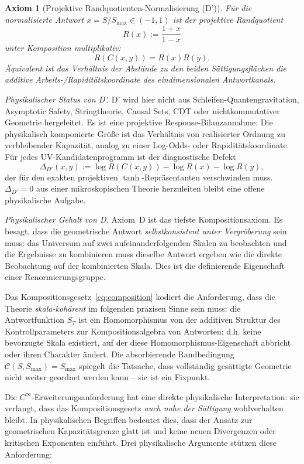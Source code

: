 \documentclass[aps,prd,twocolumn,superscriptaddress,nofootinbib]{revtex4-2}
\newtheorem{axiom}{Axiom}
\begin{document}
\begin{axiom}[Projektive Randquotienten-Normalisierung (D')]
\label{ax:projective_quotient}
Für die normalisierte Antwort $x=S/S_{\max}\in(-1,1)$ ist der projektive Randquotient
\[
  R(x):=\frac{1+x}{1-x}
\]
unter Komposition multiplikativ:
\begin{equation}
  R(C(x,y))=R(x)R(y).
  \label{eq:projective_quotient}
\end{equation}
Äquivalent ist das Verhältnis der Abstände zu den beiden Sättigungsflächen die additive Arbeits-/Rapiditätskoordinate des eindimensionalen Antwortkanals.
\end{axiom}

\textit{Physikalischer Status von D'.} D' wird hier nicht aus Schleifen-Quantengravitation, Asymptotic Safety, Stringtheorie, Causal Sets, CDT oder nichtkommutativer Geometrie hergeleitet. Es ist eine projektive Response-Bilanzannahme: Die physikalisch komponierte Größe ist das Verhältnis von realisierter Ordnung zu verbleibender Kapazität, analog zu einer Log-Odds- oder Rapiditätskoordinate. Für jedes UV-Kandidatenprogramm ist der diagnostische Defekt
\[
  \Delta_{D'}(x,y):=\log R(C(x,y))-\log R(x)-\log R(y),
\]
der für den exakten projektiven $\tanh$-Repräsentanten verschwinden muss. $\Delta_{D'}=0$ aus einer mikroskopischen Theorie herzuleiten bleibt eine offene physikalische Aufgabe.

\textit{Physikalischer Gehalt von D.} Axiom~D ist das tiefste Kompositionsaxiom. Es besagt, dass die geometrische Antwort \textit{selbstkonsistent unter Vergröberung} sein muss: das Universum auf zwei aufeinanderfolgenden Skalen zu beobachten und die Ergebnisse zu kombinieren muss dieselbe Antwort ergeben wie die direkte Beobachtung auf der kombinierten Skala. Dies ist die definierende Eigenschaft einer Renormierungsgruppe.

Das Kompositionsgesetz~\eqref{eq:composition} kodiert die Anforderung, dass die Theorie \textit{skala-kohärent} im folgenden präzisen Sinne sein muss: die Antwortfunktion $S_T$ ist ein Homomorphismus von der additiven Struktur des Kontrollparameters zur Kompositionsalgebra von Antworten; d.h. keine bevorzugte Skala existiert, auf der diese Homomorphismus-Eigenschaft abbricht oder ihren Charakter ändert. Die absorbierende Randbedingung $\mathcal{C}(S, S_{\max}) = S_{\max}$ spiegelt die Tatsache, dass vollständig gesättigte Geometrie nicht weiter geordnet werden kann -- sie ist ein Fixpunkt.

Die $C^\infty$-Erweiterungsanforderung hat eine direkte physikalische Interpretation: sie verlangt, dass das Kompositionsgesetz \textit{auch nahe der Sättigung} wohlverhalten bleibt. In physikalischen Begriffen bedeutet dies, dass der Ansatz zur geometrischen Kapazitätsgrenze glatt ist und keine neuen Divergenzen oder kritischen Exponenten einführt. Drei physikalische Argumente stützen diese Anforderung:
\end{document}

